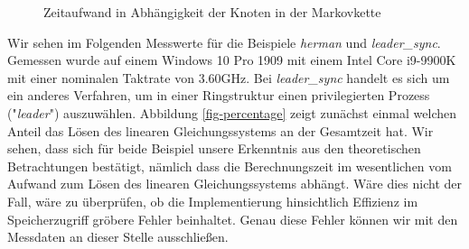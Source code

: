 \documentclass[a4paper]{article}
\theoremstyle{nonumberplain}
\begin{document}

\begin{figure}
	\caption{Zeitaufwand in Abhängigkeit der Knoten in der Markovkette}
	\label{fig-in-nodes}
	\centering
\end{figure}

Wir sehen im Folgenden Messwerte für die Beispiele \textit{herman} und \textit{leader\_sync}. Gemessen wurde auf einem Windows 10 Pro 1909 mit einem Intel Core i9-9900K mit einer nominalen Taktrate von 3.60GHz.
Bei \textit{leader\_sync} handelt es sich um ein anderes Verfahren, um in einer Ringstruktur einen privilegierten Prozess ("\textit{leader}") auszuwählen. Abbildung \ref{fig-percentage} zeigt zunächst einmal welchen Anteil das Lösen des linearen Gleichungssystems an der Gesamtzeit hat. Wir sehen, dass sich für beide Beispiel unsere Erkenntnis aus den theoretischen Betrachtungen bestätigt, nämlich dass die Berechnungszeit im wesentlichen vom Aufwand zum Lösen des linearen Gleichungssystems abhängt. Wäre dies nicht der Fall, wäre zu überprüfen, ob die Implementierung hinsichtlich Effizienz im Speicherzugriff gröbere Fehler beinhaltet. Genau diese Fehler können wir mit den Messdaten an dieser Stelle ausschließen.
\end{document}

